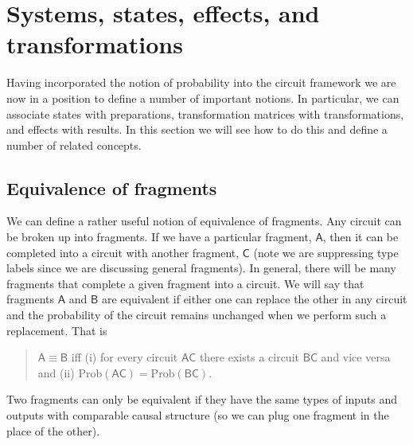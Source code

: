 \documentclass[10pt]{article}
\begin{document}
\section{Systems, states, effects, and transformations}

Having incorporated the notion of probability into the circuit framework we are now in a position to define a number of important notions.  In particular, we can associate states with preparations, transformation matrices with transformations, and effects with results.  In this section we will see how to do this and define a number of related concepts.





\subsection{Equivalence of fragments}\label{equivalenceoffragments}

We can define a rather useful notion of equivalence of fragments.  Any circuit can be broken up into fragments.  If we have a particular fragment, $\mathsf{A}$, then it can be completed into a circuit with another fragment, $\mathsf{C}$ (note we are suppressing type labels since we are discussing general fragments).  In general, there will be many fragments that complete a given fragment into a circuit.  We will say that fragments $\mathsf A$ and $\mathsf B$ are equivalent if either one can replace the other in any circuit and the probability of the circuit remains unchanged when we perform such a replacement.  That is
\begin{quote}
$\mathsf A \equiv \mathsf B$ iff (i) for every circuit $\mathsf{AC}$ there exists a circuit $\mathsf{BC}$ and vice versa and (ii)   $\text{Prob}(\mathsf{AC})=\text{Prob}(\mathsf{BC})$.
\end{quote}
Two fragments can only be equivalent if they have the same types of inputs and outputs with comparable causal structure (so we can plug one fragment in the place of the other).
\end{document}
